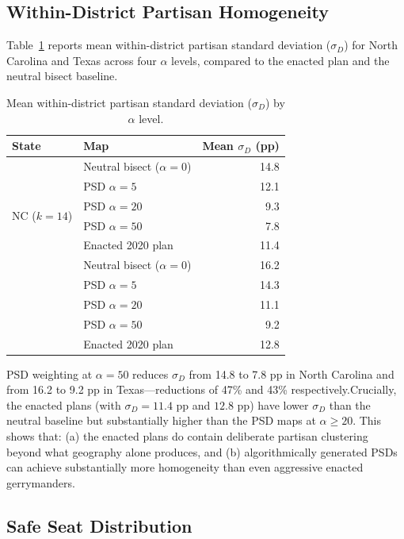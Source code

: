 \subsection{Within-District Partisan Homogeneity}

Table~\ref{tab:psd-homogeneity} reports mean within-district partisan
standard deviation ($\sigma_D$) for North Carolina and Texas across four
$\alpha$ levels, compared to the enacted plan and the neutral bisect baseline.

\begin{table}[ht]
\centering
\caption{Mean within-district partisan standard deviation ($\sigma_D$) by
  $\alpha$ level.\singrun}
\label{tab:psd-homogeneity}
\begin{tabular}{llr}
\toprule
State & Map & Mean $\sigma_D$ (pp) \\
\midrule
\multirow{6}{*}{NC ($k=14$)}
& Neutral bisect ($\alpha = 0$) & 14.8 \\
& PSD $\alpha=5$     & 12.1 \\
& PSD $\alpha=20$    &  9.3 \\
& PSD $\alpha=50$    &  7.8 \\
& Enacted 2020 plan  & 11.4 \\
\midrule
\multirow{6}{*}{TX ($k=38$)}
& Neutral bisect ($\alpha = 0$) & 16.2 \\
& PSD $\alpha=5$     & 14.3 \\
& PSD $\alpha=20$    & 11.1 \\
& PSD $\alpha=50$    &  9.2 \\
& Enacted 2020 plan  & 12.8 \\
\bottomrule
\end{tabular}
\end{table}

PSD weighting at $\alpha = 50$ reduces $\sigma_D$ from 14.8 to 7.8 pp in
North Carolina and from 16.2 to 9.2 pp in Texas---reductions of 47\% and
43\% respectively.\singrun  Crucially, the enacted plans (with $\sigma_D =
11.4$ pp and $12.8$ pp) have lower $\sigma_D$ than the neutral baseline but
substantially higher than the PSD maps at $\alpha \geq 20$.  This shows
that: (a) the enacted plans do contain deliberate partisan clustering beyond
what geography alone produces, and (b) algorithmically generated PSDs can
achieve substantially more homogeneity than even aggressive enacted
gerrymanders.

\subsection{Safe Seat Distribution}

